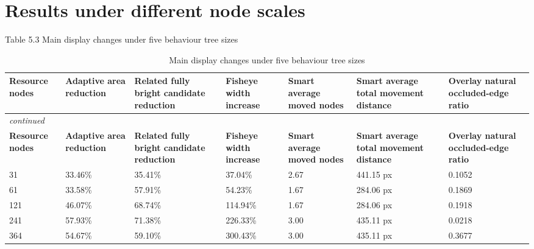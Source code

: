 \documentclass[11pt,a4paper,oneside,extrafontsizes]{memoir}
\begin{document}
\section{Results under different node scales}

Table 5.3 Main display changes under five behaviour tree sizes

\begin{center}

\begin{longtable}{@{}p{} p{} p{} p{} p{} p{} p{}@{}}
\caption{Main display changes under five behaviour tree sizes}\label{tab:tree-size-results}\\
\toprule
\textbf{Resource nodes} & \textbf{Adaptive area reduction} & \textbf{Related fully bright candidate reduction} & \textbf{Fisheye width increase} & \textbf{Smart average moved nodes} & \textbf{Smart average total movement distance} & \textbf{Overlay natural occluded-edge ratio} \\
\midrule
\endfirsthead
\multicolumn{7}{l}{\itshape continued}\\
\toprule
\textbf{Resource nodes} & \textbf{Adaptive area reduction} & \textbf{Related fully bright candidate reduction} & \textbf{Fisheye width increase} & \textbf{Smart average moved nodes} & \textbf{Smart average total movement distance} & \textbf{Overlay natural occluded-edge ratio} \\
\midrule
\endhead
31 & 33.46\% & 35.41\% & 37.04\% & 2.67 & 441.15 px & 0.1052 \\
61 & 33.58\% & 57.91\% & 54.23\% & 1.67 & 284.06 px & 0.1869 \\
121 & 46.07\% & 68.74\% & 114.94\% & 1.67 & 284.06 px & 0.1918 \\
241 & 57.93\% & 71.38\% & 226.33\% & 3.00 & 435.11 px & 0.0218 \\
364 & 54.67\% & 59.10\% & 300.43\% & 3.00 & 435.11 px & 0.3677 \\
\bottomrule
\end{longtable}


\end{center}
\end{document}
